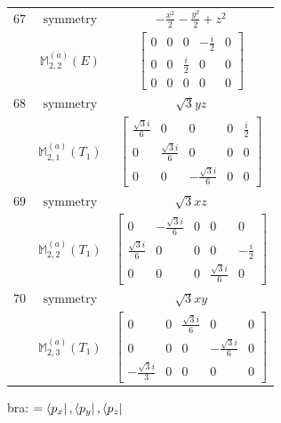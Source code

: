 \documentclass[fleqn,8pt,landscape]{jsarticle}
\begin{document}
\begin{longtable}{ccc}
$ 67 $ & $ \text{symmetry} $ & $ - \frac{x^{2}}{2} - \frac{y^{2}}{2} + z^{2} $ \\
$  $ & $ \mathbb{M}_{2,2}^{(a)}(E) $ & $ \begin{bmatrix} 0 & 0 & 0 & - \frac{i}{2} & 0 \\ 0 & 0 & \frac{i}{2} & 0 & 0 \\ 0 & 0 & 0 & 0 & 0 \end{bmatrix} $ \\ \hline
$ 68 $ & $ \text{symmetry} $ & $ \sqrt{3} y z $ \\
$  $ & $ \mathbb{M}_{2,1}^{(a)}(T_{1}) $ & $ \begin{bmatrix} \frac{\sqrt{3} i}{6} & 0 & 0 & 0 & \frac{i}{2} \\ 0 & \frac{\sqrt{3} i}{6} & 0 & 0 & 0 \\ 0 & 0 & - \frac{\sqrt{3} i}{6} & 0 & 0 \end{bmatrix} $ \\ \hline
$ 69 $ & $ \text{symmetry} $ & $ \sqrt{3} x z $ \\
$  $ & $ \mathbb{M}_{2,2}^{(a)}(T_{1}) $ & $ \begin{bmatrix} 0 & - \frac{\sqrt{3} i}{6} & 0 & 0 & 0 \\ \frac{\sqrt{3} i}{6} & 0 & 0 & 0 & - \frac{i}{2} \\ 0 & 0 & 0 & \frac{\sqrt{3} i}{6} & 0 \end{bmatrix} $ \\ \hline
$ 70 $ & $ \text{symmetry} $ & $ \sqrt{3} x y $ \\
$  $ & $ \mathbb{M}_{2,3}^{(a)}(T_{1}) $ & $ \begin{bmatrix} 0 & 0 & \frac{\sqrt{3} i}{6} & 0 & 0 \\ 0 & 0 & 0 & - \frac{\sqrt{3} i}{6} & 0 \\ - \frac{\sqrt{3} i}{3} & 0 & 0 & 0 & 0 \end{bmatrix} $ \\ \hline
\end{longtable}
bra: $=\bra{p_{x}}, \bra{p_{y}}, \bra{p_{z}}$
\end{document}
